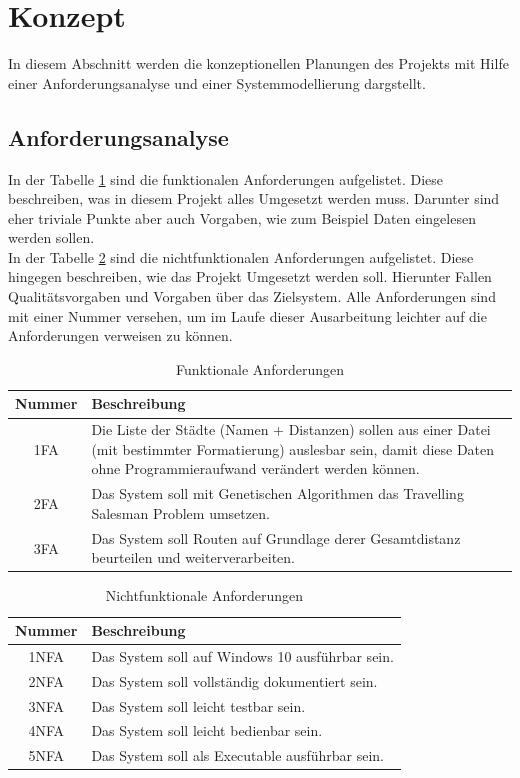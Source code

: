 \section{Konzept}
In diesem Abschnitt werden die konzeptionellen Planungen des Projekts mit Hilfe einer Anforderungsanalyse und einer Systemmodellierung dargstellt.

\subsection{Anforderungsanalyse}
In der Tabelle \ref{tab:fa} sind die funktionalen Anforderungen aufgelistet. Diese beschreiben, was in diesem Projekt alles Umgesetzt werden muss. Darunter sind eher triviale Punkte aber auch Vorgaben, wie zum Beispiel Daten eingelesen werden sollen.\\
In der Tabelle \ref{tab:nfa} sind die nichtfunktionalen Anforderungen aufgelistet. Diese hingegen beschreiben, wie das Projekt Umgesetzt werden soll. Hierunter Fallen Qualitätsvorgaben und Vorgaben über das Zielsystem.
Alle Anforderungen sind mit einer Nummer versehen, um im Laufe dieser Ausarbeitung leichter auf die Anforderungen verweisen zu können.

\begin{table}[H]
\caption{Funktionale Anforderungen}
\begin{tabular}{|c|p{12cm}|}
Nummer & Beschreibung \\
\hline
1FA & Die Liste der Städte (Namen + Distanzen) sollen aus einer Datei (mit bestimmter Formatierung) auslesbar sein, damit diese Daten ohne Programmieraufwand verändert werden können. \\  
2FA & Das System soll mit Genetischen Algorithmen das Travelling Salesman Problem umsetzen. \\  
3FA & Das System soll Routen auf Grundlage derer Gesamtdistanz beurteilen und weiterverarbeiten. \\  
\end{tabular}
\label{tab:fa}
\end{table}

\begin{table}[H]
\caption{Nichtfunktionale Anforderungen}
\begin{tabular}{|c|p{10cm}|}
 Nummer & Beschreibung \\ 
\hline
1NFA & Das System soll auf Windows 10 ausführbar sein.\\
2NFA & Das System soll vollständig dokumentiert sein.\\
3NFA & Das System soll leicht testbar sein.\\
4NFA & Das System soll leicht bedienbar sein.\\
5NFA & Das System soll als Executable ausführbar sein.\\
\end{tabular}
\label{tab:nfa}
\end{table}

